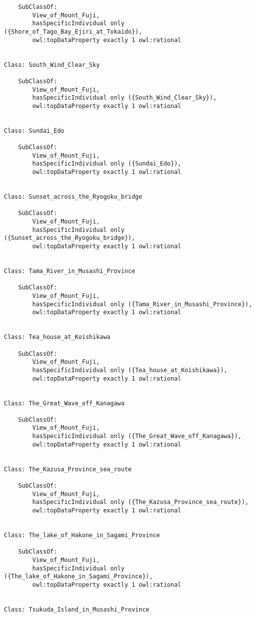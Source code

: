 \documentclass[titlepage,a4paper,12pt,oneside]{book}
\begin{document}
\begin{appendices}
\begin{lstlisting}
    SubClassOf: 
        View_of_Mount_Fuji,
        hasSpecificIndividual only ({Shore_of_Tago_Bay_Ejiri_at_Tokaido}),
        owl:topDataProperty exactly 1 owl:rational
    
    
Class: South_Wind_Clear_Sky

    SubClassOf: 
        View_of_Mount_Fuji,
        hasSpecificIndividual only ({South_Wind_Clear_Sky}),
        owl:topDataProperty exactly 1 owl:rational
    
    
Class: Sundai_Edo

    SubClassOf: 
        View_of_Mount_Fuji,
        hasSpecificIndividual only ({Sundai_Edo}),
        owl:topDataProperty exactly 1 owl:rational
    
    
Class: Sunset_across_the_Ryogoku_bridge

    SubClassOf: 
        View_of_Mount_Fuji,
        hasSpecificIndividual only ({Sunset_across_the_Ryogoku_bridge}),
        owl:topDataProperty exactly 1 owl:rational
    
    
Class: Tama_River_in_Musashi_Province

    SubClassOf: 
        View_of_Mount_Fuji,
        hasSpecificIndividual only ({Tama_River_in_Musashi_Province}),
        owl:topDataProperty exactly 1 owl:rational
    
    
Class: Tea_house_at_Koishikawa

    SubClassOf: 
        View_of_Mount_Fuji,
        hasSpecificIndividual only ({Tea_house_at_Koishikawa}),
        owl:topDataProperty exactly 1 owl:rational
    
    
Class: The_Great_Wave_off_Kanagawa

    SubClassOf: 
        View_of_Mount_Fuji,
        hasSpecificIndividual only ({The_Great_Wave_off_Kanagawa}),
        owl:topDataProperty exactly 1 owl:rational
    
    
Class: The_Kazusa_Province_sea_route

    SubClassOf: 
        View_of_Mount_Fuji,
        hasSpecificIndividual only ({The_Kazusa_Province_sea_route}),
        owl:topDataProperty exactly 1 owl:rational
    
    
Class: The_lake_of_Hakone_in_Sagami_Province

    SubClassOf: 
        View_of_Mount_Fuji,
        hasSpecificIndividual only ({The_lake_of_Hakone_in_Sagami_Province}),
        owl:topDataProperty exactly 1 owl:rational
    
    
Class: Tsukuda_Island_in_Musashi_Province


\end{lstlisting}
\end{appendices}
\end{document}
